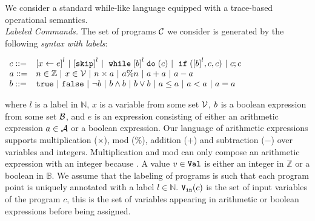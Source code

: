 We consider a standard while-like language equipped with a trace-based operational semantics.\\

\noindent\emph{Labeled Commands.}
The set of programs $\mathcal{C}$ we consider is generated by the following \emph{syntax with labels}: 
\begin{center}
$
\begin{array}{ll}
{c} ::= &
\clabel{\assign{x}{\expr}}^l 
~|~ \clabel{\eskip}^l
~|~ \ewhile \clabel{\bexpr}^{l} \edo ({c})
~|~ \eif(\clabel{\bexpr}^{l} , {c}, {c}) 
~|~ {c};{c} \\
\aexpr ::= &
n \in \mathbb{Z} ~|~ x \in \vardom ~|~ n \times \aexpr~|~ \aexpr \% n ~|~ \aexpr + \aexpr ~|~ \aexpr - \aexpr\\
\bexpr ::= & 
%
\etrue ~|~ \efalse  ~|~ \neg \bexpr
 ~|~ \bexpr \land \bexpr
%
~|~ \bexpr \lor \bexpr 
~|~ \aexpr \leq \aexpr 
~|~ \aexpr < \aexpr 
~|~ \aexpr = \aexpr 
\end{array}
$
\end{center}
where $l$ is a label in $\mathbb{N}$, $x$ is a variable from
some set $\mathcal{V}$, $b$ is a boolean expression from some set
$\mathcal{B}$, and $e$ is an expression consisting of either an
arithmetic expression $a \in \mathcal{A}$ or a boolean
expression.
Our language of arithmetic expressions supports  multiplication ($\times $), mod ($\%$), addition ($+$) and subtraction ($-$) over variables and integers. Multiplication and mod can only compose an arithmetic expression with an integer because .
A value $v\in \mathtt{Val}$ is either an integer in $\mathbb{Z}$ or a boolean in $\mathbb{B}$.
We 
assume that the labeling of programs is such that each program
point is uniquely annotated with a label $l\in\mathbb{N}$.
${\mathtt{V_{\mathtt{in}}}}(c)$ is the set of input variables of the program $c$, this is the set of variables appearing in arithmetic or boolean expressions before being assigned.
%


